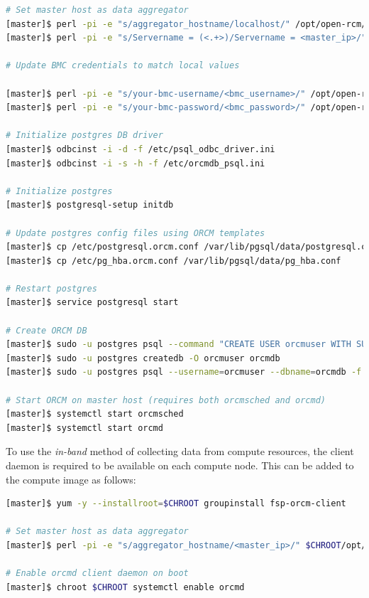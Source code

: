 \documentclass[letterpaper]{article}
\begin{document}
\begin{lstlisting}[language=bash,keywords={},upquote=true,keepspaces]
# Set master host as data aggregator
[master]$ perl -pi -e "s/aggregator_hostname/localhost/" /opt/open-rcm/etc/orcm-site.xml
[master]$ perl -pi -e "s/Servername = (<.+>)/Servername = <master_ip>/" /etc/orcmdb_psql.ini

# Update BMC credentials to match local values

[master]$ perl -pi -e "s/your-bmc-username/<bmc_username>/" /opt/open-rcm/etc/openmpi-mca-params.conf
[master]$ perl -pi -e "s/your-bmc-password/<bmc_password>/" /opt/open-rcm/etc/openmpi-mca-params.conf

# Initialize postgres DB driver
[master]$ odbcinst -i -d -f /etc/psql_odbc_driver.ini
[master]$ odbcinst -i -s -h -f /etc/orcmdb_psql.ini 

# Initialize postgres
[master]$ postgresql-setup initdb

# Update postgres config files using ORCM templates
[master]$ cp /etc/postgresql.orcm.conf /var/lib/pgsql/data/postgresql.conf
[master]$ cp /etc/pg_hba.orcm.conf /var/lib/pgsql/data/pg_hba.conf

# Restart postgres
[master]$ service postgresql start

# Create ORCM DB
[master]$ sudo -u postgres psql --command "CREATE USER orcmuser WITH SUPERUSER PASSWORD 'orcmpassword';"
[master]$ sudo -u postgres createdb -O orcmuser orcmdb
[master]$ sudo -u postgres psql --username=orcmuser --dbname=orcmdb -f /etc/orcmdb_psql.sql

# Start ORCM on master host (requires both orcmsched and orcmd)
[master]$ systemctl start orcmsched
[master]$ systemctl start orcmd
\end{lstlisting}

To use the {\em in-band} method of collecting data from compute resources, the
\ORCM{} client daemon is required to be available on each compute node. This can
be added to the compute image as follows:

\begin{lstlisting}[language=bash,keywords={},upquote=true]
[master]$ yum -y --installroot=$CHROOT groupinstall fsp-orcm-client

# Set master host as data aggregator
[master]$ perl -pi -e "s/aggregator_hostname/<master_ip>/" $CHROOT/opt/open-rcm/etc/orcm-site.xml

# Enable orcmd client daemon on boot
[master]$ chroot $CHROOT systemctl enable orcmd
\end{lstlisting}
\end{document}
